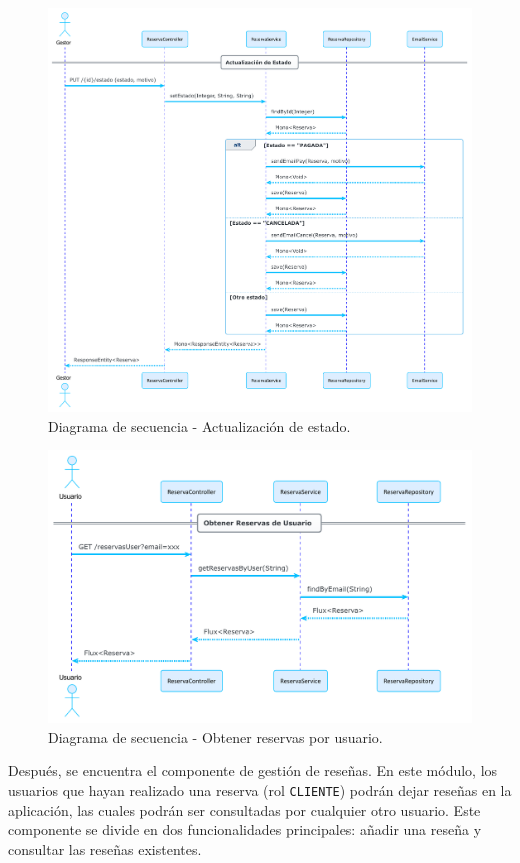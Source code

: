 \begin{figure}[h!tb]
\centering
\includegraphics[width=\textwidth]{figs/secuencia_reserva_estado.pdf}
\caption{Diagrama de secuencia - Actualización de estado.\label{fig:secuencia_reserva_estado}}
\end{figure}

\begin{figure}[h!tb]
\centering
\includegraphics[width=\textwidth]{figs/secuencia_reserva_usuario.pdf}
\caption{Diagrama de secuencia - Obtener reservas por usuario.\label{fig:secuencia_reserva_usuario}}
\end{figure}
Después, se encuentra el componente de gestión de reseñas. En este módulo, los usuarios que hayan realizado una reserva (rol \texttt{CLIENTE}) podrán dejar reseñas en la aplicación, las cuales podrán ser consultadas por cualquier otro usuario. Este componente se divide en dos funcionalidades principales: añadir una reseña y consultar las reseñas existentes.


